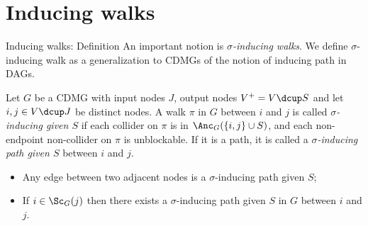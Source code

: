 \section{Inducing walks}
\frame{\sectionpage}

\begin{frame}{Inducing walks: Definition}
  An important notion is \emph{$\sigma$-inducing walks}.
We define $\sigma$-inducing walk as a generalization to CDMGs of the notion of inducing path \cite{VermaPearl1990} in DAGs. %
  \begin{Def}[\ref{def:sigma-inducing_path}]
Let $G$ be a CDMG with input nodes $J$, output nodes $V^+ = V \dcup S$ and let $i,j \in V \dcup J$ be distinct nodes.
A walk $\pi$ in $G$ between $i$ and $j$ is called \emph{$\sigma$-inducing given $S$} if  each collider on $\pi$ is in $\Anc_{G}(\{i,j\}\cup S)$, and each non-endpoint non-collider on $\pi$ is unblockable. 
If it is a path, it is called a \emph{$\sigma$-inducing path given $S$} between $i$ and $j$.
\end{Def}
  \begin{itemize}
    \item Any edge between two adjacent nodes is a $\sigma$-inducing path given $S$;
    \item If $i \in \Sc_G(j)$ then there exists a $\sigma$-inducing path given $S$ in $G$ between $i$ and $j$.
  \end{itemize}
\end{frame}

